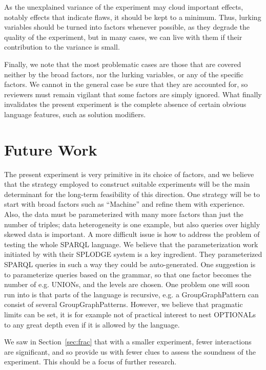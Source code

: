 \documentclass{llncs}
\begin{document}
As the unexplained variance of the experiment may cloud important
effects, notably effects that indicate flaws, it should be kept to a
minimum. Thus, lurking variables should be turned into factors
whenever possible, as they degrade the quality of the experiment, but
in many cases, we can live with them if their contribution to the
variance is small.

Finally, we note that the most problematic cases are those that are
covered neither by the broad factors, nor the lurking variables, or
any of the specific factors. We cannot in the general case be sure
that they are accounted for, so reviewers must remain vigilant that
some factors are simply ignored. What finally invalidates the present
experiment is the complete absence of certain obvious language
features, such as solution modifiers.

\section{Future Work}

The present experiment is very primitive in its choice of factors, and
we believe that the strategy employed to construct suitable
experiments will be the main determinant for the long-term feasibility
of this direction. One strategy will be to start with broad factors
such as ``Machine'' and refine them with experience. Also, the data
must be parameterized with many more factors than just the number of
triples; data heterogeneity \cite{Duan:2011:AOC:1989323.1989340} is one
example, but also queries over highly skewed data is important. A more
difficult issue is how to address the problem of testing the whole
SPARQL language\cite{sparql11query}. We believe that the
parameterization work initiated by \cite{goerlitz2012splodge} with
their SPLODGE system is a key ingredient. They parameterized SPARQL
queries in such a way they could be auto-generated. One suggestion is
to parameterize queries based on the grammar, so that one factor
becomes the number of e.g. UNIONs, and the levels are chosen. One
problem one will soon run into is that parts of the language is
recursive, e.g. a GroupGraphPattern can consist of several
GroupGraphPatterns. However, we believe that pragmatic limits can be
set, it is for example not of practical interest to nest OPTIONALs to
any great depth even if it is allowed by the language.

We saw in Section~\ref{sec:frac} that with a smaller experiment, fewer
interactions are significant, and so provide us with fewer clues to
assess the soundness of the experiment. This should be a focus of
further research.
\end{document}
